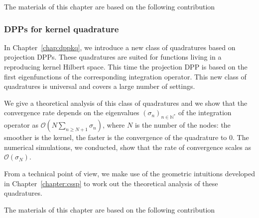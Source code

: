 \documentclass[twoside,11pt]{book}
\numberwithin{theorem}{chapter}
\numberwithin{definition}{chapter}
\numberwithin{proposition}{chapter}
\numberwithin{corollary}{chapter}
\numberwithin{example}{chapter}
\numberwithin{lemma}{chapter}
\numberwithin{assumption}{chapter}
\numberwithin{equation}{chapter}
\numberwithin{figure}{chapter}
\DeclareMathOperator{\X}{\mathcal{X}}
\begin{document}
The materials of this chapter
are based on the following contribution 
\subsubsection{DPPs for kernel quadrature}

In Chapter~\ref{chap:dppkq}, we introduce a new class of quadratures based on projection DPPs. These quadratures are suited for functions living in a reproducing kernel Hilbert space. This time the projection DPP is based on the first eigenfunctions of the corresponding integration operator. 
This new class of quadratures is universal and covers a large number of settings. 


We give a theoretical analysis of this class of quadratures and we show that the convergence rate depends on the eigenvalues $(\sigma_{n})_{n \in \mathbb{N}^{*}}$ of the integration operator as $\mathcal{O}(N\sum_{n \geq N+1} \sigma_n)$, where $N$ is the number of the nodes: the smoother is the kernel, the faster is the convergence of the quadrature to $0$. The numerical simulations, we conducted, show that the rate of convergence scales as $\mathcal{O}(\sigma_{N})$.

From a technical point of view, we make use of the geometric intuitions developed in Chapter~\ref{chapter:cssp} to work out the theoretical analysis of these quadratures. 

The materials of this chapter
are based on the following contribution






\end{document}
